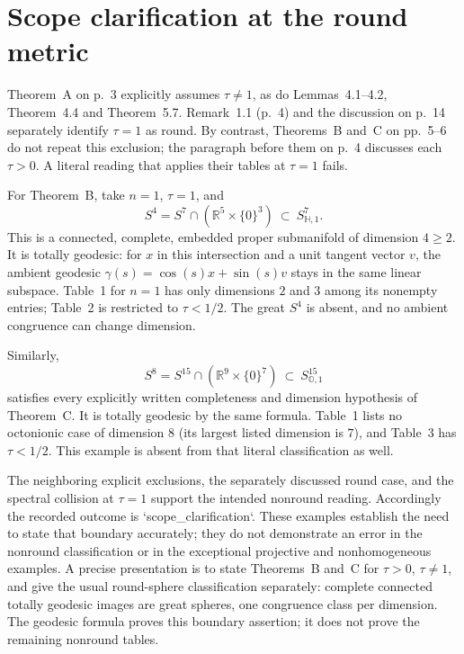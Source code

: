 \documentclass[10pt]{article}
\begin{document}
\section*{Scope clarification at the round metric}
Theorem A on p. 3 explicitly assumes \(\tau\ne1\), as do Lemmas 4.1–4.2, Theorem 4.4 and Theorem 5.7. Remark 1.1 (p. 4) and the discussion on p. 14 separately identify \(\tau=1\) as round. By contrast, Theorems B and C on pp. 5–6 do not repeat this exclusion; the paragraph before them on p. 4 discusses each \(\tau>0\). A literal reading that applies their tables at \(\tau=1\) fails.\par
For Theorem B, take \(n=1\), \(\tau=1\), and \[S^4=S^7\cap(\mathbb R^5\times\{0\}^3)
       \ \subset\ S^7_{\mathbb H,1}.\] This is a connected, complete, embedded proper submanifold of dimension \(4\ge2\). It is totally geodesic: for \(x\) in this intersection and a unit tangent vector \(v\), the ambient geodesic \(\gamma(s)=\cos(s)x+\sin(s)v\) stays in the same linear subspace. Table 1 for \(n=1\) has only dimensions \(2\) and \(3\) among its nonempty entries; Table 2 is restricted to \(\tau<1/2\). The great \(S^4\) is absent, and no ambient congruence can change dimension.\par
Similarly, \[S^8=S^{15}\cap(\mathbb R^9\times\{0\}^7)
       \ \subset\ S^{15}_{\mathbb O,1}\] satisfies every explicitly written completeness and dimension hypothesis of Theorem C. It is totally geodesic by the same formula. Table 1 lists no octonionic case of dimension \(8\) (its largest listed dimension is \(7\)), and Table 3 has \(\tau<1/2\). This example is absent from that literal classification as well.\par
The neighboring explicit exclusions, the separately discussed round case, and the spectral collision at \(\tau=1\) support the intended nonround reading. Accordingly the recorded outcome is `scope\_clarification`. These examples establish the need to state that boundary accurately; they do not demonstrate an error in the nonround classification or in the exceptional projective and nonhomogeneous examples. A precise presentation is to state Theorems B and C for \(\tau>0\), \(\tau\ne1\), and give the usual round-sphere classification separately: complete connected totally geodesic images are great spheres, one congruence class per dimension. The geodesic formula proves this boundary assertion; it does not prove the remaining nonround tables.\par
\end{document}
